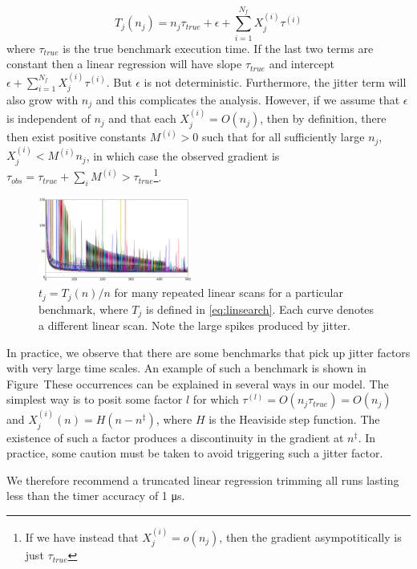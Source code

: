 \documentclass[conference]{IEEEtran}
\begin{document}
\begin{equation}
    \label{eq:linsearch}
    T_j(n_j) = n_j \tau_{true} + \epsilon + \sum_{i=1}^{N_f} X_j^{(i)} \tau^{(i)}
\end{equation}
%
where $\tau_{true}$ is the true benchmark execution time. If the last two terms
are constant then a linear regression will have slope $\tau_{true}$ and intercept $\epsilon + \sum_{i=1}^{N_f} X_j^{(i)} \tau^{(i)}$. But $\epsilon$ is not deterministic. Furthermore, the jitter term will also grow with $n_j$ and this complicates the analysis.
However, if we assume that $\epsilon$ is independent of $n_j$ and that each $X_j^{(i)} = O(n_j)$, then by definition, there then exist positive constants $M^{(i)} > 0$ such that for all sufficiently large $n_j$, $X_j^{(i)} < M^{(i)} n_j$, in which case the observed gradient is $\tau_{obs} = \tau_{true} + \sum_i M^{(i)} > \tau_{true}$\footnote{If we have instead that $X_j^{(i)} = o(n_j)$, then the gradient asympotitically is just $\tau_{true}$}.

\begin{figure}
\centering
\includegraphics[width=0.45\textwidth]{figures/fig2/linear_scan_branchsum_no_recurse_wide}
\caption{$t_j = T_j(n)/n$ for many repeated linear scans for a particular benchmark, where $T_j$ is defined in \eqref{eq:linsearch}. Each curve denotes a different linear scan. Note the large spikes produced by jitter.}
\label{fig:scaling}
\end{figure}

In practice, we observe that there are some benchmarks that pick up jitter factors with very large time scales. An example of such a benchmark is shown in Figure~These occurrences can be explained in several ways in our model. The simplest way is to posit some factor $l$ for which $\tau^{(l)} = O(n_j \tau_{true}) = O(n_j)$ and $X_j^{(i)}(n) = H(n - n^\ddagger)$,
where $H$ is the Heaviside step function. The existence of such a factor produces a discontinuity in the gradient at $n^\ddagger$. In practice, some caution must be taken to avoid triggering such a jitter factor.

We therefore recommend a truncated linear regression trimming all runs lasting less than the timer accuracy of 1 μs.
\end{document}
